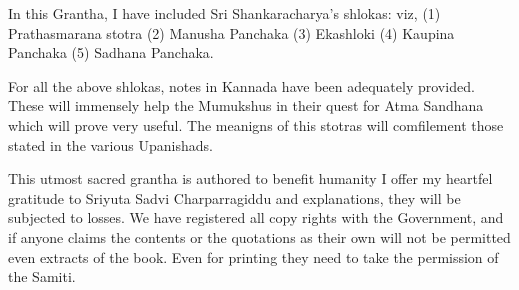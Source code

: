 \vskip 2pt

In this Grantha, I have included Sri Shankaracharya's shlokas: viz, (1) Prathasmarana stotra (2) Manusha Panchaka (3) Ekashloki (4) Kaupina Panchaka (5) Sadhana Panchaka.

\vskip 2pt

For all the above shlokas, notes in Kannada have been adequately provided. These will immensely help the Mumukshus in their quest for Atma Sandhana which will prove very useful. The meanigns of this stotras will comfilement those stated in the various Upanishads.

\vskip 2pt

This utmost sacred grantha is authored to benefit humanity I offer my heartfel gratitude to Sriyuta Sadvi Charparragiddu and explanations, they will be subjected to losses. We have registered all copy rights with the Government, and if anyone claims the contents or the quotations as their own will not be permitted even extracts of the book. Even for printing they need to take the permission of the Samiti.

\chapter*{}

\begin{verse}
\end{verse}

\begin{verse}
\end{verse}

\begin{verse}
\end{verse}

\begin{verse}
\end{verse}

\begin{verse}
\end{verse}

